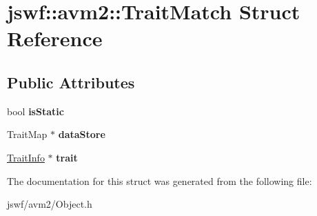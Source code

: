 \hypertarget{structjswf_1_1avm2_1_1_trait_match}{\section{jswf\+:\+:avm2\+:\+:Trait\+Match Struct Reference}
\label{structjswf_1_1avm2_1_1_trait_match}
}
\subsection*{Public Attributes}
\begin{DoxyCompactItemize}
\item 
\hypertarget{structjswf_1_1avm2_1_1_trait_match_abba698a1bb22d0ea1aa431013ed3eadc}{bool {\bfseries is\+Static}}\label{structjswf_1_1avm2_1_1_trait_match_abba698a1bb22d0ea1aa431013ed3eadc}

\item 
\hypertarget{structjswf_1_1avm2_1_1_trait_match_a6f7a2bf7d21ab352df0ba2e9f7062a2e}{Trait\+Map $\ast$ {\bfseries data\+Store}}\label{structjswf_1_1avm2_1_1_trait_match_a6f7a2bf7d21ab352df0ba2e9f7062a2e}

\item 
\hypertarget{structjswf_1_1avm2_1_1_trait_match_a035b658c75b47325fe9fda80d0f109a5}{\hyperlink{structjswf_1_1avm2_1_1_trait_info}{Trait\+Info} $\ast$ {\bfseries trait}}\label{structjswf_1_1avm2_1_1_trait_match_a035b658c75b47325fe9fda80d0f109a5}

\end{DoxyCompactItemize}


The documentation for this struct was generated from the following file\+:\begin{DoxyCompactItemize}
\item 
jswf/avm2/Object.\+h\end{DoxyCompactItemize}

